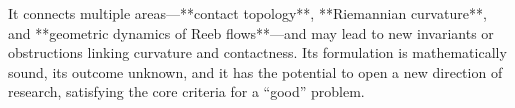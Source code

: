 It connects multiple areas—**contact topology**, **Riemannian curvature**, and **geometric dynamics of Reeb flows**—and may lead to new invariants or obstructions linking curvature and contactness. Its formulation is mathematically sound, its outcome unknown, and it has the potential to open a new direction of research, satisfying the core criteria for a “good” problem.